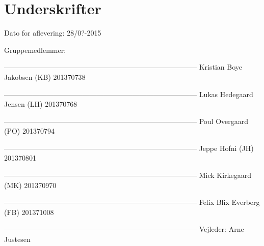 \chapter*{Underskrifter}

Dato for aflevering: 28/0?-2015

Gruppemedlemmer: \newline


--------------------------------------------------------------------------------- \newline
Kristian Boye Jakobsen (KB) 201370738\newline


--------------------------------------------------------------------------------- \newline
Lukas Hedegaard Jensen (LH) 201370768\newline


--------------------------------------------------------------------------------- \newline
Poul Overgaard (PO) 201370794\newline


--------------------------------------------------------------------------------- \newline
Jeppe Hofni (JH) 201370801\newline


--------------------------------------------------------------------------------- \newline
Mick Kirkegaard (MK) 201370970\newline


--------------------------------------------------------------------------------- \newline
Felix Blix Everberg (FB) 201371008\newline













--------------------------------------------------------------------------------- \newline
Vejleder: Arne Justesen \newline

\afterpage{\null\newpage}
